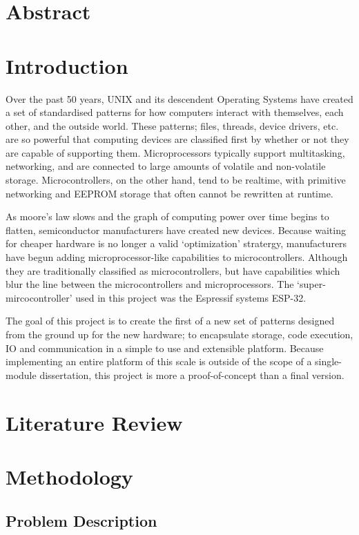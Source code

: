 \documentclass{article}
\begin{document}
\section{Abstract}


\tableofcontents
\section{Introduction}
Over the past 50 years, UNIX and its descendent Operating Systems have created a set of standardised patterns for how computers interact with themselves, each other, and the outside world.
These patterns; files, threads, device drivers, etc. are so powerful that computing devices are classified first by whether or not they are capable of supporting them.
Microprocessors typically support multitasking, networking, and are connected to large amounts of volatile and non-volatile storage.
Microcontrollers, on the other hand, tend to be realtime, with primitive networking and EEPROM storage that often cannot be rewritten at runtime.

As moore's law slows and the graph of computing power over time begins to flatten, semiconductor manufacturers have created new devices.
Because waiting for cheaper hardware is no longer a valid \lq optimization' stratergy, manufacturers have begun adding microprocessor-like capabilities to microcontrollers.
Although they are traditionally classified as microcontrollers, but have capabilities which blur the line between the microcontrollers and microprocessors.
The \lq super-mircocontroller' used in this project was the Espressif systems ESP-32.

The goal of this project is to create the first of a new set of patterns designed from the ground up for the new hardware; to encapsulate storage, code execution, IO and communication in a simple to use and extensible platform.
Because implementing an entire platform of this scale is outside of the scope of a single-module dissertation, this project is more a proof-of-concept than a final version.


\pagebreak
\section{Literature Review}


\section{Methodology}
\subsection{Problem Description}
\end{document}
